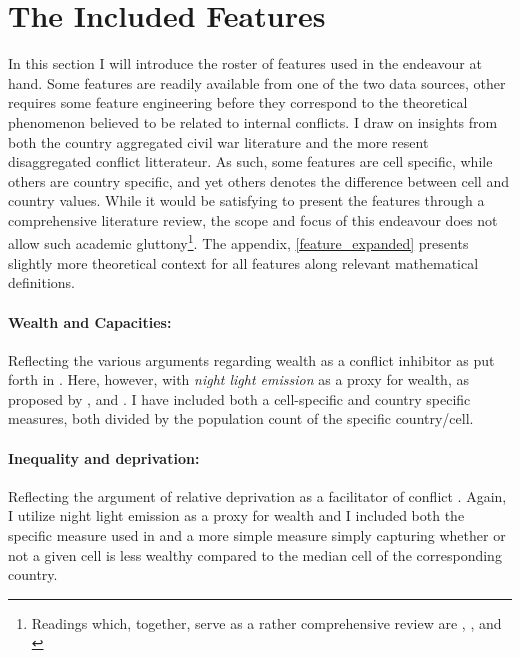 \documentclass[a4paper]{article}
\begin{document}
\section{The Included Features}

In this section I will introduce the roster of features used in the endeavour at hand. Some features are readily available from one of the two data sources, other requires some feature engineering before they correspond to the theoretical phenomenon believed to be related to internal conflicts. I draw on insights from both the country aggregated civil war literature and the more resent disaggregated conflict litterateur. As such, some features are cell specific, while others are country specific, and yet others denotes the difference between cell and country values. While it would be satisfying to present the features through a comprehensive literature review, the scope and focus of this endeavour does not allow such academic gluttony\footnote{Readings which, together, serve as a rather comprehensive review are \cite{Hegre_Sambanis_2006}, \cite{Kalyvas_2007}, \cite{Cederman_Gleditsch_2009} and \cite{Blattman_Miguel_2010}}. The appendix, \autoref{feature_expanded} presents slightly more theoretical context for all features along relevant mathematical definitions.\par

\paragraph{Wealth and Capacities:} Reflecting the various arguments regarding wealth as a conflict inhibitor as put forth in \cite{Collier_Hoeffler_1998, Fearon_Laitin_2003, Collier_Hoeffler_2004}. Here, however, with \emph{night light emission} as a proxy for wealth, as proposed by \cite{Elvidge_2009}, \cite{Chen_Nordhuas_2011} and \cite{Cederman_Gleditsch_Buhaug_2013}. I have included both a cell-specific and country specific measures, both divided by the population count of the specific country/cell.\par

\paragraph{Inequality and deprivation:} Reflecting the argument of relative deprivation as a facilitator of conflict \citep{Gurr_1970, Cederman_Gleditsch_Buhaug_2013}. Again, I utilize night light emission as a proxy for wealth and I included both the specific measure used in \cite{Cederman_Gleditsch_Buhaug_2013} and a more simple measure simply capturing whether or not a given cell is less wealthy compared to the median cell of the corresponding country.\par
\end{document}

